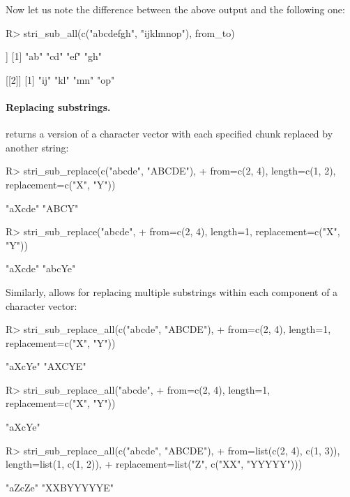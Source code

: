 \documentclass[nojss]{jss}\usepackage[]{graphicx}\usepackage[]{color}
\begin{document}
\noindent
Now let us note the difference between the above output and the following one:

\begin{Schunk}
\begin{Sinput}
R> stri_sub_all(c("abcdefgh", "ijklmnop"), from_to)
\end{Sinput}
\begin{Soutput}
[[1]]
[1] "ab" "cd" "ef" "gh"

[[2]]
[1] "ij" "kl" "mn" "op"
\end{Soutput}
\end{Schunk}




\paragraph{Replacing substrings.}
 returns a version
of a character vector with each specified chunk replaced by another
string:

\begin{Schunk}
\begin{Sinput}
R> stri_sub_replace(c("abcde", "ABCDE"),
+    from=c(2, 4), length=c(1, 2), replacement=c("X", "Y"))
\end{Sinput}
\begin{Soutput}
[1] "aXcde" "ABCY"
\end{Soutput}
\begin{Sinput}
R> stri_sub_replace("abcde",
+    from=c(2, 4), length=1, replacement=c("X", "Y"))
\end{Sinput}
\begin{Soutput}
[1] "aXcde" "abcYe"
\end{Soutput}
\end{Schunk}

\noindent
Similarly,  allows for replacing
multiple substrings within each component of a character vector:

\begin{Schunk}
\begin{Sinput}
R> stri_sub_replace_all(c("abcde", "ABCDE"),
+    from=c(2, 4), length=1, replacement=c("X", "Y"))
\end{Sinput}
\begin{Soutput}
[1] "aXcYe" "AXCYE"
\end{Soutput}
\begin{Sinput}
R> stri_sub_replace_all("abcde",
+    from=c(2, 4), length=1, replacement=c("X", "Y"))
\end{Sinput}
\begin{Soutput}
[1] "aXcYe"
\end{Soutput}
\begin{Sinput}
R> stri_sub_replace_all(c("abcde", "ABCDE"),
+    from=list(c(2, 4), c(1, 3)), length=list(1, c(1, 2)),
+    replacement=list("Z", c("XX", "YYYYY")))
\end{Sinput}
\begin{Soutput}
[1] "aZcZe"     "XXBYYYYYE"
\end{Soutput}
\end{Schunk}
\end{document}

